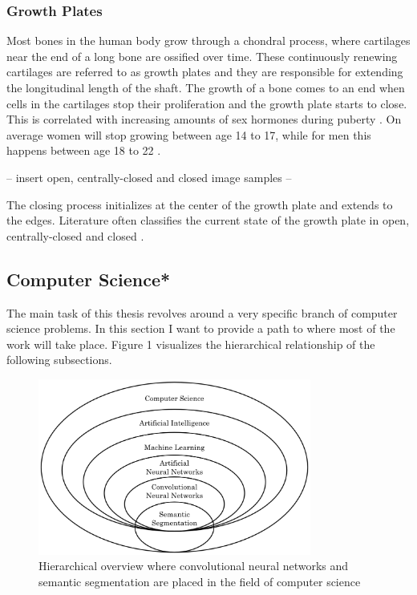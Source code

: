 \subsubsection{Growth Plates}

Most bones in the human body grow through a chondral process, where cartilages near the end of a long bone are ossified over time. These continuously renewing cartilages are referred to as growth plates and they are responsible for extending the longitudinal length of the shaft. The growth of a bone comes to an end when cells in the cartilages stop their proliferation and the growth plate starts to close. This is correlated with increasing amounts of sex hormones during puberty \cite{Aumuller2010}. On average women will stop growing between age 14 to 17, while for men this happens between age 18 to 22 \cite{Attarian2013}.

-- insert open, centrally-closed and closed image samples --

The closing process initializes at the center of the growth plate and extends to the edges.  Literature often classifies the current state of the growth plate in open, centrally-closed and closed \cite{Alexander2015}.

\subsection{Computer Science*}

The main task of this thesis revolves around a very specific branch of computer science problems. In this section I want to provide a path to where most of the work will take place. Figure 1 visualizes the hierarchical relationship of the following subsections.

\begin{figure}[H]
\centering
\par
\includegraphics[width=0.8\textwidth]{imgs/cs_hier.png}
\caption{Hierarchical overview where convolutional neural networks and semantic segmentation are placed in the field of computer science}
\par
\end{figure}

